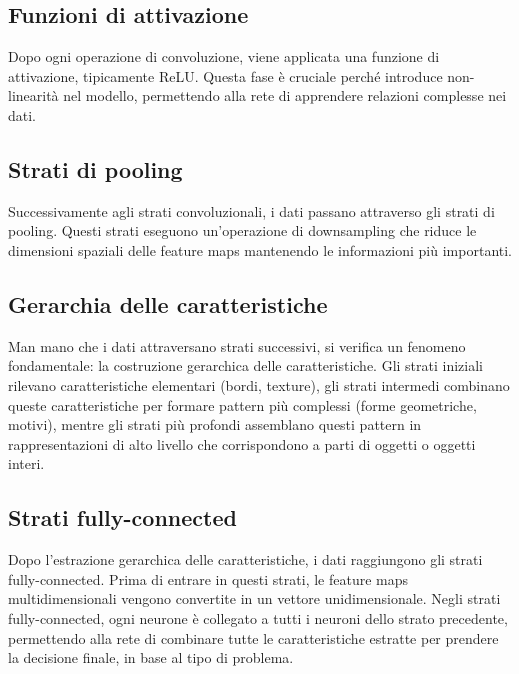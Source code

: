 \documentclass[a4paper,12pt]{report}
\begin{document}
	\subsection{Funzioni di attivazione}
	Dopo ogni operazione di convoluzione, viene applicata una funzione di attivazione, tipicamente ReLU. Questa fase è cruciale perché introduce non-linearità nel modello, permettendo alla rete di apprendere relazioni complesse nei dati.
	
	\subsection{Strati di pooling}
	Successivamente agli strati convoluzionali, i dati passano attraverso gli strati di pooling. Questi strati eseguono un’operazione di downsampling che riduce le dimensioni spaziali delle feature maps mantenendo le informazioni più importanti.
	
	\subsection{Gerarchia delle caratteristiche}
	Man mano che i dati attraversano strati successivi, si verifica un fenomeno fondamentale: la costruzione gerarchica delle caratteristiche. Gli strati iniziali rilevano caratteristiche elementari (bordi, texture), gli strati intermedi combinano queste caratteristiche per formare pattern più complessi (forme geometriche, motivi), mentre gli strati più profondi assemblano questi pattern in rappresentazioni di alto livello che corrispondono a parti di oggetti o oggetti interi.
	
	\subsection{Strati fully-connected}
	Dopo l’estrazione gerarchica delle caratteristiche, i dati raggiungono gli strati fully-connected. Prima di entrare in questi strati, le feature maps multidimensionali vengono convertite in un vettore unidimensionale. Negli strati fully-connected, ogni neurone è collegato a tutti i neuroni dello strato precedente, permettendo alla rete di combinare tutte le caratteristiche estratte per prendere la decisione finale, in base al tipo di problema.
	
\end{document}
